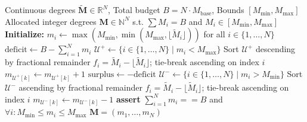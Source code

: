 \documentclass[10pt,journal,compsoc]{IEEEtran}
\begin{document}
\begin{algorithm}[t]
\caption{Hare-Niemeyer Integer Degree Discretization (\texttt{budget\_allocator.hpp})}
\label{alg:geometry_allocation}
\begin{algorithmic}[1]
\REQUIRE Continuous degrees $\tilde{\mathbf{M}} \in \mathbb{R}^N$, Total budget $B = N \cdot M_{\text{base}}$, Bounds $[M_{\min}, M_{\max}]$
\ENSURE Allocated integer degrees $\mathbf{M} \in \mathbb{N}^N$ s.t. $\sum M_i = B$ and $M_i \in [M_{\min}, M_{\max}]$
\STATE \textbf{Initialize:} $m_i \gets \max(M_{\min}, \min(M_{\max}, \lfloor \tilde{M}_i \rfloor))$ for all $i \in \{1,\dots,N\}$
\STATE $\text{deficit} \gets B - \sum_{i=1}^N m_i$
    \STATE $\mathcal{U}^+ \gets \{ i \in \{1,\dots,N\} \mid m_i < M_{\max} \}$
    \STATE Sort $\mathcal{U}^+$ descending by fractional remainder $f_i = \tilde{M}_i - \lfloor \tilde{M}_i \rfloor$; tie-break ascending on index $i$
        \STATE $m_{\mathcal{U}^+[k]} \gets m_{\mathcal{U}^+[k]} + 1$
    \ENDFOR
{}
    \STATE $\text{surplus} \gets -\text{deficit}$
    \STATE $\mathcal{U}^- \gets \{ i \in \{1,\dots,N\} \mid m_i > M_{\min} \}$
    \STATE Sort $\mathcal{U}^-$ ascending by fractional remainder $f_i = \tilde{M}_i - \lfloor \tilde{M}_i \rfloor$; tie-break ascending on index $i$
        \STATE $m_{\mathcal{U}^-[k]} \gets m_{\mathcal{U}^-[k]} - 1$
    \ENDFOR
\ENDIF
\STATE \textbf{assert} $\sum_{i=1}^N m_i == B$ and $\forall i: M_{\min} \le m_i \le M_{\max}$
\RETURN $\mathbf{M} = (m_1, \dots, m_N)$
\end{algorithmic}
\end{algorithm}
\end{document}
